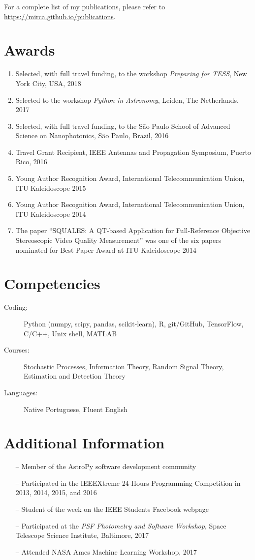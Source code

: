 \documentclass[10pt]{article}
\begin{document}
\begin{titlepage}
For a complete list of my publications, please refer to \url{https://mirca.github.io/publications}.

\section*{Awards}
\begin{enumerate}
  \item Selected, with full travel funding, to the workshop \textit{Preparing for TESS}, New York City, USA, 2018
  \item Selected to the workshop \textit{Python in Astronomy}, Leiden, The Netherlands, 2017
  \item Selected, with full travel funding, to the S\~ao Paulo School of Advanced Science on Nanophotonics, S\~ao Paulo, Brazil, 2016
  \item Travel Grant Recipient, IEEE Antennas and Propagation Symposium, Puerto Rico, 2016
  \item Young Author Recognition Award, International Telecommunication Union, ITU Kaleidoscope 2015
  \item Young Author Recognition Award, International Telecommunication Union, ITU Kaleidoscope 2014
  \item The paper ``SQUALES: A QT-based Application for Full-Reference Objective Stereoscopic
      Video Quality Measurement'' was one of the six papers nominated for Best Paper Award at ITU Kaleidoscope 2014
\end{enumerate}

\section*{Competencies}
\begin{description}
    \item[Coding:] Python (numpy, scipy, pandas, scikit-learn), R, git/GitHub, TensorFlow, C/C++, Unix shell, MATLAB
    \item[Courses:] Stochastic Processes, Information Theory, Random Signal Theory, Estimation and Detection Theory
    \item[Languages:] Native Portuguese, Fluent English
\end{description}

\section*{Additional Information}
\begin{itemize}
    \item[--] Member of the AstroPy software development community
    \item[--] Participated in the IEEEXtreme 24-Hours Programming Competition in 2013, 2014, 2015, and 2016
    \item[--] Student of the week on the IEEE Students Facebook webpage
    \item[--] Participated at the \textit{PSF Photometry and Software Workshop}, Space Telescope Science Institute, Baltimore, 2017
    \item[--] Attended NASA Ames Machine Learning Workshop, 2017
\end{itemize}

\end{titlepage}
\end{document}
